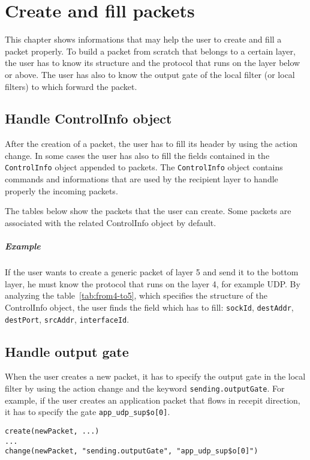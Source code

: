

\chapter{Create and fill packets}
\label{ch:appendix-C}

This chapter shows informations that may help the user to create and fill a packet properly. To build a packet from scratch that belongs to a certain layer, the user has to know its structure and the protocol that runs on the layer below or above. The user has also to know the output gate of the local filter (or local filters) to which forward the packet.

\section{Handle ControlInfo object}

After the creation of a packet, the user has to fill its header by using the action change. In some cases the user has also to fill the fields contained in the \texttt{ControlInfo} object appended to packets. The \texttt{ControlInfo} object contains commands and informations that are used by the recipient layer to handle properly the incoming packets.

The tables below show the packets that the user can create. Some packets are associated with the related ControlInfo object by default.

\paragraph{Example}
If the user wants to create a generic packet of layer 5 and send it to the bottom layer, he must know the protocol that runs on the layer 4, for example UDP. By analyzing the table~\ref{tab:from4-to5}, which specifies the structure of the ControlInfo object, the user finds the field which has to fill: \texttt{sockId}, \texttt{destAddr}, \texttt{destPort}, \texttt{srcAddr}, \texttt{interfaceId}.


\section{Handle output gate}
When the user creates a new packet, it has to specify the output gate in the local filter by using the action change and the keyword \texttt{sending.outputGate}. For example, if the user creates an application packet that flows in recepit direction, it has to specify the gate \texttt{app\_udp\_sup\$o[0]}.
%
\begin{lstlisting}[language={asl}, caption={Handle output gate example}]
create(newPacket, ...)
...
change(newPacket, "sending.outputGate", "app_udp_sup$o[0]")
\end{lstlisting}




